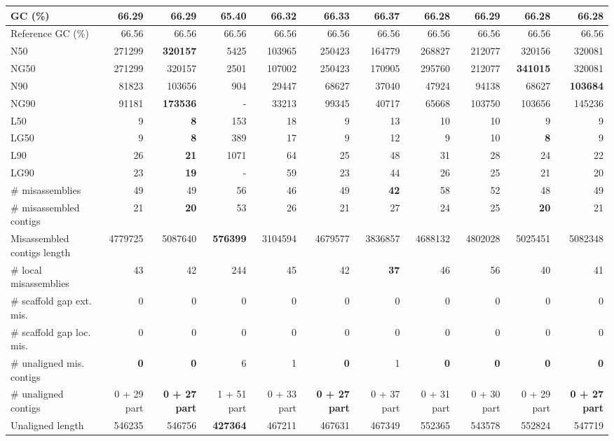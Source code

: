\documentclass[12pt,a4paper]{article}
\begin{document}
\begin{table}[ht]
\begin{center}
\begin{tabular}{|l*{10}{|r}|}
GC (\%) & 66.29 & 66.29 & 65.40 & 66.32 & 66.33 & 66.37 & 66.28 & 66.29 & 66.28 & 66.28 \\ \hline
Reference GC (\%) & 66.56 & 66.56 & 66.56 & 66.56 & 66.56 & 66.56 & 66.56 & 66.56 & 66.56 & 66.56 \\ \hline
N50 & 271299 & {\bf 320157} & 5425 & 103965 & 250423 & 164779 & 268827 & 212077 & 320156 & 320081 \\ \hline
NG50 & 271299 & 320157 & 2501 & 107002 & 250423 & 170905 & 295760 & 212077 & {\bf 341015} & 320081 \\ \hline
N90 & 81823 & 103656 & 904 & 29447 & 68627 & 37040 & 47924 & 94138 & 68627 & {\bf 103684} \\ \hline
NG90 & 91181 & {\bf 173536} & - & 33213 & 99345 & 40717 & 65668 & 103750 & 103656 & 145236 \\ \hline
L50 & 9 & {\bf 8} & 153 & 18 & 9 & 13 & 10 & 10 & 9 & 9 \\ \hline
LG50 & 9 & {\bf 8} & 389 & 17 & 9 & 12 & 9 & 10 & {\bf 8} & 9 \\ \hline
L90 & 26 & {\bf 21} & 1071 & 64 & 25 & 48 & 31 & 28 & 24 & 22 \\ \hline
LG90 & 23 & {\bf 19} & - & 59 & 23 & 44 & 26 & 25 & 21 & 20 \\ \hline
\# misassemblies & 49 & 49 & 56 & 46 & 49 & {\bf 42} & 58 & 52 & 48 & 49 \\ \hline
\# misassembled contigs & 21 & {\bf 20} & 53 & 26 & 21 & 27 & 24 & 25 & {\bf 20} & 21 \\ \hline
Misassembled contigs length & 4779725 & 5087640 & {\bf 576399} & 3104594 & 4679577 & 3836857 & 4688132 & 4802028 & 5025451 & 5082348 \\ \hline
\# local misassemblies & 43 & 42 & 244 & 45 & 42 & {\bf 37} & 46 & 56 & 40 & 41 \\ \hline
\# scaffold gap ext. mis. & 0 & 0 & 0 & 0 & 0 & 0 & 0 & 0 & 0 & 0 \\ \hline
\# scaffold gap loc. mis. & 0 & 0 & 0 & 0 & 0 & 0 & 0 & 0 & 0 & 0 \\ \hline
\# unaligned mis. contigs & {\bf 0} & {\bf 0} & 6 & 1 & {\bf 0} & 1 & {\bf 0} & {\bf 0} & {\bf 0} & {\bf 0} \\ \hline
\# unaligned contigs & 0 + 29 part & {\bf 0 + 27 part} & 1 + 51 part & 0 + 33 part & {\bf 0 + 27 part} & 0 + 37 part & 0 + 31 part & 0 + 30 part & 0 + 29 part & {\bf 0 + 27 part} \\ \hline
Unaligned length & 546235 & 546756 & {\bf 427364} & 467211 & 467631 & 467349 & 552365 & 543578 & 552824 & 547719 \\ \hline

\end{tabular}
\end{center}
\end{table}
\end{document}
